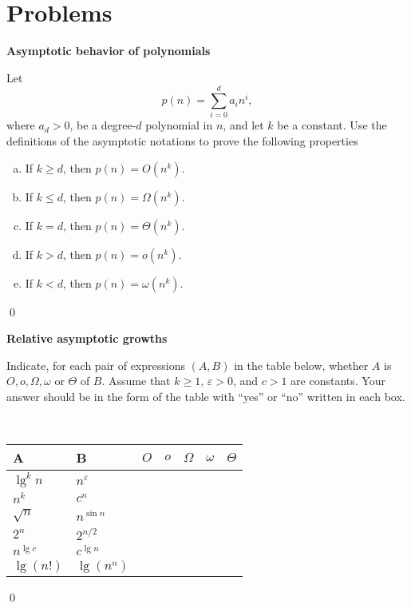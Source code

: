 \section{Problems}

 \textbf{Asymptotic behavior of polynomials}

Let $$p(n) = \sum_{i=0}^d a_i n^i,$$ where $a_d > 0$, be a degree-$d$ polynomial in $n$, and let $k$ be a constant. Use the definitions of the asymptotic notations to prove the following properties

\begin{enumerate}[(a)]
    \item If $k \geq d$, then $p(n) = O(n^k)$.
    \item If $k \leq d$, then $p(n) = \Omega(n^k)$.
    \item If $k = d$, then $p(n) = \Theta(n^k)$.
    \item If $k > d$, then $p(n) = o(n^k)$.
    \item If $k < d$, then $p(n) = \omega(n^k)$.
\end{enumerate}

\sol \qed

 \textbf{Relative asymptotic growths}

Indicate, for each pair of expressions $(A,B)$ in the table below, whether $A$ is $O, o, \Omega, \omega$ or $\Theta$ of $B$. Assume that $k \geq 1, \, \varepsilon > 0$, and $c > 1$ are constants. Your answer should be in the form of the table with ``yes'' or ``no'' written in each box.

\,

\begin{center}
\begin{tabular}{|l|l|l|l|l|l|l|}
    \hline
    A           & B                 & $O$ & $o$ & $\Omega$ & $\omega$ & $\Theta$ \\\hline
    $\lg^k n$   & $n^{\varepsilon}$ &     &     &          &          &                         \\\hline
    $n^k$       & $c^n$             &     &     &          &          &                         \\\hline
    $\sqrt{n}$  & $n^{\sin n}$      &     &     &          &          &                         \\\hline
    $2^n$       & $2^{n/2}$         &     &     &          &          &                         \\\hline
    $n^{\lg c}$ & $c^{\lg n}$       &     &     &          &          &                         \\\hline
    $\lg(n!)$   & $\lg(n^n)$        &     &     &          &          &                        \\\hline
\end{tabular}
\end{center}
\qed

